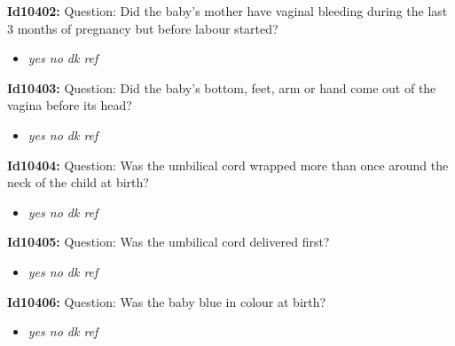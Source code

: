 \documentclass{article}%
\begin{document}
\textbf{Id10402: \newline%
}%
Question: Did the baby's mother have vaginal bleeding during the last 3 months of pregnancy but before labour started?\newline%
%
\begin{itemize}%
\item%
\textit{yes\newline%
 no\newline%
 dk\newline%
 ref\newline%
}%
\end{itemize}%
\textbf{Id10403: \newline%
}%
Question: Did the baby's bottom, feet, arm or hand come out of the vagina before its head?\newline%
%
\begin{itemize}%
\item%
\textit{yes\newline%
 no\newline%
 dk\newline%
 ref\newline%
}%
\end{itemize}%
\textbf{Id10404: \newline%
}%
Question: Was the umbilical cord wrapped more than once around the neck of the child at birth?\newline%
%
\begin{itemize}%
\item%
\textit{yes\newline%
 no\newline%
 dk\newline%
 ref\newline%
}%
\end{itemize}%
\textbf{Id10405: \newline%
}%
Question: Was the umbilical cord delivered first?\newline%
%
\begin{itemize}%
\item%
\textit{yes\newline%
 no\newline%
 dk\newline%
 ref\newline%
}%
\end{itemize}%
\textbf{Id10406: \newline%
}%
Question: Was the baby blue in colour at birth?\newline%
%
\begin{itemize}%
\item%
\textit{yes\newline%
 no\newline%
 dk\newline%
 ref\newline%
}%
\end{itemize}%
\end{document}
